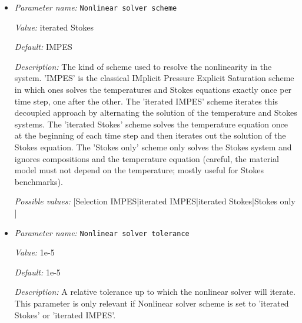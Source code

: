 \begin{itemize}
{\it Value:} 5.69e+300


{\it Default:} 5.69e+300


{\it Description:} Set a maximum time step size for the solver to use. Generally the time step based on the CFL number should be sufficient, but for complicated models or benchmarking it may be useful to limit the time step to some value. The default value is a value so that when converted from years into seconds it equals the largest number representable by a floating point number, implying an unlimited time step.Units: Years or seconds, depending on the ``Use years in output instead of seconds'' parameter.


{\it Possible values:} [Double 0...1.79769e+308 (inclusive)]
\item {\it Parameter name:} {\tt Nonlinear solver scheme}


{\it Value:} iterated Stokes


{\it Default:} IMPES


{\it Description:} The kind of scheme used to resolve the nonlinearity in the system. 'IMPES' is the classical IMplicit Pressure Explicit Saturation scheme in which ones solves the temperatures and Stokes equations exactly once per time step, one after the other. The 'iterated IMPES' scheme iterates this decoupled approach by alternating the solution of the temperature and Stokes systems. The 'iterated Stokes' scheme solves the temperature equation once at the beginning of each time step and then iterates out the solution of the Stokes equation. The 'Stokes only' scheme only solves the Stokes system and ignores compositions and the temperature equation (careful, the material model must not depend on the temperature; mostly useful for Stokes benchmarks).


{\it Possible values:} [Selection IMPES|iterated IMPES|iterated Stokes|Stokes only ]
\item {\it Parameter name:} {\tt Nonlinear solver tolerance}


{\it Value:} 1e-5


{\it Default:} 1e-5


{\it Description:} A relative tolerance up to which the nonlinear solver will iterate. This parameter is only relevant if Nonlinear solver scheme is set to 'iterated Stokes' or 'iterated IMPES'.



\end{itemize}
